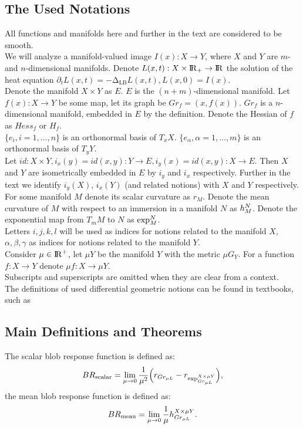 \documentclass{llncs}
\newcommand{\LaplaceBeltrami}{\mathrm{\Delta_{{LB}}}}
\newcommand{\partderiv}[2]{\partial_{#2} {#1}}
\newcommand{\toreal}{\rightarrow\bbbr}
\newcommand{\TangentSpaceArg}[2]{{T_{#2}}{#1}}
\newcommand{\FRScalar}{BR_{\mathrm{scalar}}}
\newcommand{\FRMean}{BR_{\mathrm{mean}}}
\begin{document}
\subsection{The Used Notations}
All functions and manifolds here and further in the text are considered to be smooth. 
\\ 
We will analyze a manifold-valued image $I(x):X \to Y$, where $X$ and $Y$ are $m$- and $n$-dimensional manifolds. Denote $L(x,t):X\times \bbbr_{+} \toreal$ the solution of the heat equation $\partderiv{L(x, t)}{t}=-\LaplaceBeltrami{ L(x, t)},L(x, 0)=I(x)$. 
\\
Denote the manifold $X\times Y$ as $E$. $E$ is the $(n+m)$-dimensional manifold. Let $f(x):X\to Y$ be some map, let its graph be $Gr_f=(x,f(x))$. $Gr_f$ is a $n$-dimensional manifold, embedded in $E$ by the definition. Denote the Hessian of $f$ as $Hess_f$ or $H_f$.
\\
$\{e_i, i=1,\dots,n\}$ is an orthonormal basis of $T_x X$. $\{e_\alpha, \alpha=1,\dots,m\}$ is an orthonormal basis of $T_y Y$.
\\
Let $id:X\times Y, i_x(y)=id(x, y):Y\to E, i_y(x)=id(x, y):X\to E$. Then $X$ and $Y$ are isometrically embedded in $E$ by $i_y$ and $i_x$ respectively. Further in the text we identify $i_y(X)$, $i_x(Y)$ (and related notions) with $X$ and $Y$ respectively.
\\
For some manifold $M$ denote its scalar curvature as $r_M$. Denote the mean curvature of $M$ with respect to an immersion in a manifold $N$ as $\tensor*{h}{^{N}_{M}}$. Denote the exponential map from $\TangentSpaceArg{M}{m}$ to $N$ as $\tensor*{\exp}{^N_{M}}$.
\\
Letters $i,j,k,l$ will be used as indices for notions related to the manifold $X$, $\alpha, \beta, \gamma$ as indices for notions related to the manifold $Y$.
\\
Consider $\mu \in {\rm I\!R}^{+}$, let $\mu Y$ be the manifold $Y$ with the metric $\mu G_Y$. For a function $f:X\to Y$ denote $\mu f:X\to \mu Y$.
\\
Subscripts and superscripts are omitted when they are clear from a context.
\\The definitions of used differential geometric notions can be found in textbooks, such as \cite{DiffGeom}
\subsection{Main Definitions and Theorems}

\begin{definition} \label{RiemanDef}
The scalar blob response function is defined as:
\begin{equation*}\FRScalar=\lim_{\mu\to 0} \frac{1}{\mu ^ 2} \Big( r_{Gr_{\mu L}} - r_{\tensor*{\exp}{^{X\times\mu Y}_{Gr_{\mu L}}}} \Big),\end{equation*}
the mean blob response function is defined as:
\begin{equation*}\FRMean=\lim_{\mu\to 0} \frac{1}{\mu } \tensor*{h}{^{X\times\mu Y}_{Gr_{\mu L}}}.\end{equation*}
\end{definition}
\end{document}
